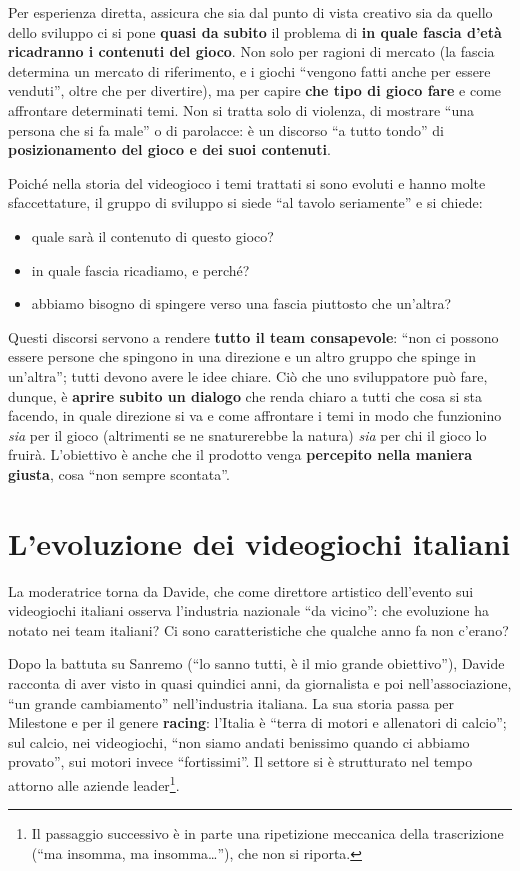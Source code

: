 Per esperienza diretta, assicura che sia dal punto di vista creativo sia da
quello dello sviluppo ci si pone \textbf{quasi da subito} il problema di
\textbf{in quale fascia d'età ricadranno i contenuti del gioco}. Non solo per
ragioni di mercato (la fascia determina un mercato di riferimento, e i giochi
``vengono fatti anche per essere venduti'', oltre che per divertire), ma per
capire \textbf{che tipo di gioco fare} e come affrontare determinati temi. Non
si tratta solo di violenza, di mostrare ``una persona che si fa male'' o di
parolacce: è un discorso ``a tutto tondo'' di \textbf{posizionamento del gioco e
dei suoi contenuti}.

Poiché nella storia del videogioco i temi trattati si sono evoluti e hanno molte
sfaccettature, il gruppo di sviluppo si siede ``al tavolo seriamente'' e si
chiede:
\begin{itemize}
  \item quale sarà il contenuto di questo gioco?
  \item in quale fascia ricadiamo, e perché?
  \item abbiamo bisogno di spingere verso una fascia piuttosto che un'altra?
\end{itemize}
Questi discorsi servono a rendere \textbf{tutto il team consapevole}: ``non ci
possono essere persone che spingono in una direzione e un altro gruppo che
spinge in un'altra''; tutti devono avere le idee chiare. Ciò che uno
sviluppatore può fare, dunque, è \textbf{aprire subito un dialogo} che renda
chiaro a tutti che cosa si sta facendo, in quale direzione si va e come
affrontare i temi in modo che funzionino \emph{sia} per il gioco (altrimenti se
ne snaturerebbe la natura) \emph{sia} per chi il gioco lo fruirà. L'obiettivo è
anche che il prodotto venga \textbf{percepito nella maniera giusta}, cosa ``non
sempre scontata''.

\section{L'evoluzione dei videogiochi italiani}
\label{sec:c1-1-italia}

La moderatrice torna da Davide, che come direttore artistico dell'evento sui
videogiochi italiani osserva l'industria nazionale ``da vicino'': che
evoluzione ha notato nei team italiani? Ci sono caratteristiche che qualche
anno fa non c'erano?

Dopo la battuta su Sanremo (``lo sanno tutti, è il mio grande obiettivo''),
Davide racconta di aver visto in quasi quindici anni, da giornalista e poi
nell'associazione, ``un grande cambiamento'' nell'industria italiana. La sua
storia passa per Milestone e per il genere \textbf{racing}: l'Italia è ``terra
di motori e allenatori di calcio''; sul calcio, nei videogiochi, ``non siamo
andati benissimo quando ci abbiamo provato'', sui motori invece
``fortissimi''. Il settore si è strutturato nel tempo attorno alle aziende
leader\footnote{Il passaggio successivo è in parte una ripetizione meccanica
della trascrizione (``ma insomma, ma insomma\dots''), che non si riporta.}.

